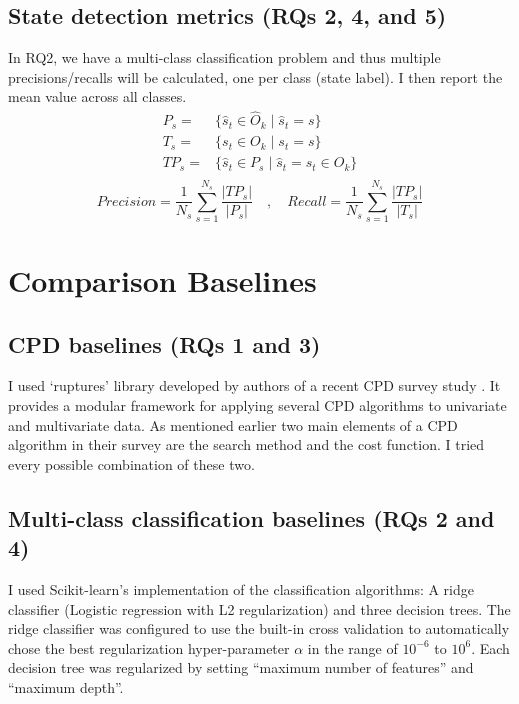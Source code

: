 \subsection{State detection metrics (RQs 2, 4, and 5)}
In RQ2, we have a multi-class classification problem and thus multiple precisions/recalls will be calculated, one per class (state label). I then report the mean value across all classes. 
\begin{equation}
\begin{split}
P_s ={}&{}\big\{\hat{s}_t \in \hat{O}_k \;\big|\; \hat{s}_t = s\big\} \\
T_s ={}&{}\big\{s_t \in O_k \;\big|\; s_t = s\big\} \\
TP_s ={}&{}\big\{\hat{s}_t \in P_s \;\big|\; \hat{s}_t = s_t \in O_k\big\} \\
\end{split}
\end{equation}
$$Precision =\frac{1}{N_s}\sum_{s=1}^{N_s} \frac{|TP_s|}{|P_s|} \quad,\quad Recall = \frac{1}{N_s}\sum_{s=1}^{N_s} \frac{|TP_s|}{|T_s|}$$

\section{Comparison Baselines} 
\subsection{CPD baselines (RQs 1 and 3)} \label{sec:CPD_baseline}
I used `ruptures' library developed by authors of a recent CPD survey study \cite{Truong2018ChangePointSurvey}. It provides a modular framework for applying several CPD algorithms to univariate and multivariate data. %
As mentioned earlier two main elements of a CPD algorithm in their survey are the search method and the cost function.
I tried every possible combination of these two.

\subsection{Multi-class classification baselines (RQs 2 and 4)}
I used Scikit-learn's implementation of the classification algorithms: A ridge classifier (Logistic regression with L2 regularization) and three decision trees. The ridge classifier was configured to use the built-in cross validation to automatically chose the best regularization hyper-parameter $\alpha$ in the range of $10^{-6}$ to $10^6$. Each decision tree was regularized by setting ``maximum number of features'' and ``maximum depth''.


